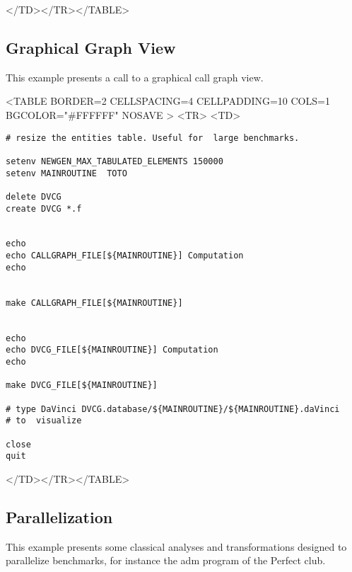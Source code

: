 \documentclass[a4paper,12pt]{article}
\begin{document}
\begin{rawhtml}
</TD></TR></TABLE>
\end{rawhtml}

\subsection{Graphical  Graph View}
\label{exm5}
This example presents a call to a graphical call graph view. 

\begin{rawhtml}
<TABLE BORDER=2 CELLSPACING=4 CELLPADDING=10 COLS=1 BGCOLOR="#FFFFFF" NOSAVE >
<TR>
<TD>
\end{rawhtml}
{\bf
\begin{verbatim}
# resize the entities table. Useful for  large benchmarks. 

setenv NEWGEN_MAX_TABULATED_ELEMENTS 150000
setenv MAINROUTINE  TOTO 

delete DVCG
create DVCG *.f


echo
echo CALLGRAPH_FILE[${MAINROUTINE}] Computation
echo


make CALLGRAPH_FILE[${MAINROUTINE}]


echo
echo DVCG_FILE[${MAINROUTINE}] Computation
echo

make DVCG_FILE[${MAINROUTINE}]

# type DaVinci DVCG.database/${MAINROUTINE}/${MAINROUTINE}.daVinci
# to  visualize 

close 
quit
\end{verbatim}
}
\begin{rawhtml}
</TD></TR></TABLE>
\end{rawhtml}

\subsection{Parallelization}
\label{exm6}
This example presents some classical analyses and transformations designed
to parallelize benchmarks, for instance the adm program of the Perfect
club. 
\end{document}
